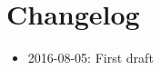 \documentclass[pdftex,11pt,a4paper]{article} %
\author{\sAuthors}
\title{\sTitle}
\begin{document}
\maketitle
\tableofcontents
\section*{Changelog}
\begin{itemize}
  \item 2016-08-05: First draft
\end{itemize}
\clearpage





%



\appendix



\end{document}
